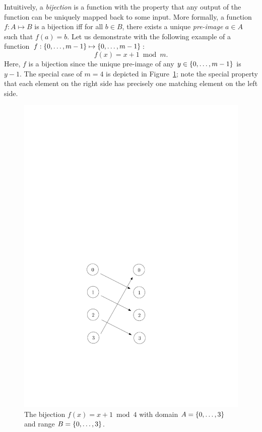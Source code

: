 \documentclass[11pt]{article}
\begin{document}
Intuitively, a \emph{bijection} is a function with the property that any output of the function can be uniquely mapped back to some input. More formally, a function $f:A\mapsto B$ is a bijection iff for all $b\in B$, there exists a unique \emph{pre-image} $a\in A$ such that $f(a)=b$. Let us demonstrate with the following example of a function $f:{\left\{0,\ldots,m-1\right\}}\mapsto{\left\{0,\ldots,m-1\right\}}$:
$$
f(x) = x + 1 \bmod m.
$$
Here, $f$ is a bijection since the unique pre-image of any $y\in {\left\{0,\ldots,m-1\right\}}$ is $y - 1$. The special case of $m=4$ is depicted in Figure~\ref{fig:bij1}; note the special property that each element on the right side has precisely one matching element on the left side.
\begin{figure}[h]
\begin{center}
\includegraphics[scale=0.55]{bij1.pdf}
\end{center}
\caption{The bijection $f(x) = x + 1 \bmod 4$ with domain $A={\left\{0,\ldots,3\right\}}$ and range $B={\left\{0,\ldots,3\right\}}$.}
\label{fig:bij1}
\end{figure}
\end{document}
